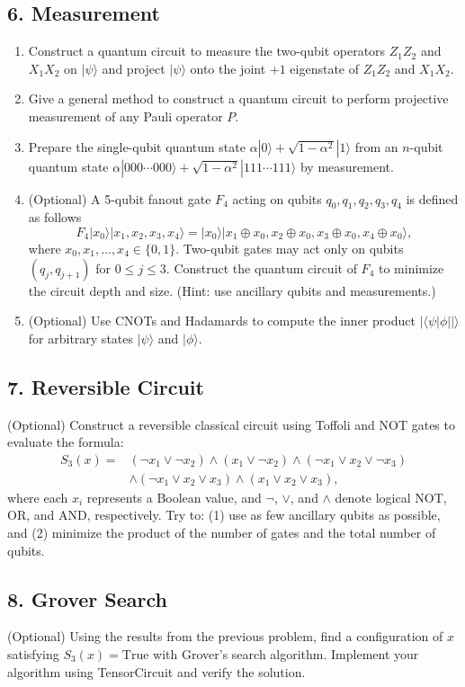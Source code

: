 \documentclass{ctexart}
\newcommand{\ket}[1]{|#1\rangle}
\newcommand{\braket}[2]{\langle #1|#2\rangle}
\begin{document}
\subsection*{6. Measurement}

\begin{enumerate}
    \item[(a)] Construct a quantum circuit to measure the two-qubit operators $Z_1 Z_2$ and $X_1 X_2$ on $\ket{\psi}$ and project $\ket{\psi}$ onto the joint $+1$ eigenstate of $Z_1 Z_2$ and $X_1 X_2$.
    \item[(b)] Give a general method to construct a quantum circuit to perform projective measurement of any Pauli operator $P$.
    \item[(c)] Prepare the single-qubit quantum state $\alpha\ket{0} + \sqrt{1-\alpha^2}\ket{1}$ from an $n$-qubit quantum state $\alpha\ket{000\cdots000} + \sqrt{1-\alpha^2}\ket{111\cdots111}$ by measurement.
    \item[(d)] (Optional) A 5-qubit fanout gate $F_4$ acting on qubits $q_0, q_1, q_2, q_3, q_4$ is defined as follows
    \begin{equation*}
        F_4 \ket{x_0}\ket{x_1, x_2, x_3, x_4} = \ket{x_0}\ket{x_1 \oplus x_0, x_2 \oplus x_0, x_3 \oplus x_0, x_4 \oplus x_0},
    \end{equation*}
    where $x_0, x_1, \ldots, x_4 \in \{0,1\}$. Two-qubit gates may act only on qubits $(q_j, q_{j+1})$ for $0 \leq j \leq 3$. Construct the quantum circuit of $F_4$ to minimize the circuit depth and size. (Hint: use ancillary qubits and measurements.)
    \item[(e)] (Optional) Use CNOTs and Hadamards to compute the inner product $|\braket{\psi|\phi}|$ for arbitrary states $\ket{\psi}$ and $\ket{\phi}$.
\end{enumerate}

\subsection*{7. Reversible Circuit}
(Optional) Construct a reversible classical circuit using Toffoli and NOT gates to evaluate the formula:
\begin{align*}
    S_3(x) = &(\neg x_1 \lor \neg x_2) \land (x_1 \lor \neg x_2) \land (\neg x_1 \lor x_2 \lor \neg x_3) \\
             &\land (\neg x_1 \lor x_2 \lor x_3) \land (x_1 \lor x_2 \lor x_3),
\end{align*}
where each $x_i$ represents a Boolean value, and $\neg$, $\lor$, and $\land$ denote logical NOT, OR, and AND, respectively. Try to: (1) use as few ancillary qubits as possible, and (2) minimize the product of the number of gates and the total number of qubits.

\subsection*{8. Grover Search}
(Optional) Using the results from the previous problem, find a configuration of $x$ satisfying $S_3(x) = \text{True}$ with Grover's search algorithm. Implement your algorithm using TensorCircuit and verify the solution.
\end{document}
